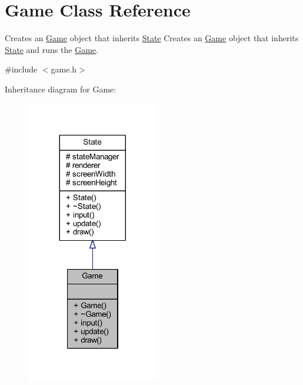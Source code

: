 \hypertarget{class_game}{\section{Game Class Reference}
\label{class_game}
}


Creates an \hyperlink{class_game}{Game} object that inherits \hyperlink{class_state}{State} Creates an \hyperlink{class_game}{Game} object that inherits \hyperlink{class_state}{State} and runs the \hyperlink{class_game}{Game}.  




{\ttfamily \#include $<$game.\+h$>$}



Inheritance diagram for Game\+:
\nopagebreak
\begin{figure}[H]
\begin{center}
\leavevmode
\includegraphics[width=164pt]{class_game__inherit__graph}
\end{center}
\end{figure}


